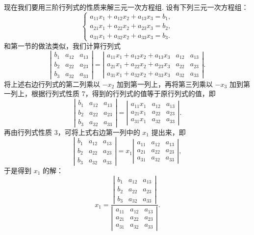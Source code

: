 \documentclass[UTF8,12pt,a4paper,fontset=fandol]{ctexart}
\begin{document}
现在我们要用三阶行列式的性质来解三元一次方程组. 设有下列三元一次方程组：
\begin{equation}
\left\{
\begin{array}{l}
a_{11}x_1+a_{12}x_2+a_{13}x_3=b_1,\\
a_{21}x_1+a_{22}x_2+a_{23}x_3=b_2,\\
a_{31}x_1+a_{32}x_2+a_{33}x_3=b_3.
\end{array}
\right.
\tag{1.2.2}
\end{equation}
和第一节的做法类似，我们计算行列式
\[
\left|\begin{array}{ccc}
b_1 & a_{12} & a_{13}\\
b_2 & a_{22} & a_{23}\\
b_3 & a_{32} & a_{33}
\end{array}\right|
=
\left|\begin{array}{ccc}
a_{11}x_1+a_{12}x_2+a_{13}x_3 & a_{12} & a_{13}\\
a_{21}x_1+a_{22}x_2+a_{23}x_3 & a_{22} & a_{23}\\
a_{31}x_1+a_{32}x_2+a_{33}x_3 & a_{32} & a_{33}
\end{array}\right|.
\]
将上述右边行列式的第二列乘以 $-x_2$ 加到第一列上，再将第三列乘以 $-x_3$ 加到第一列上，根据行列式性质 7，得到的行列式的值等于原行列式的值，即
\[
\left|\begin{array}{ccc}
b_1 & a_{12} & a_{13}\\
b_2 & a_{22} & a_{23}\\
b_3 & a_{32} & a_{33}
\end{array}\right|
=
\left|\begin{array}{ccc}
a_{11}x_1 & a_{12} & a_{13}\\
a_{21}x_1 & a_{22} & a_{23}\\
a_{31}x_1 & a_{32} & a_{33}
\end{array}\right|.
\]
再由行列式性质 3，可将上式右边第一列中的 $x_1$ 提出来，即
\[
\left|\begin{array}{ccc}
b_1 & a_{12} & a_{13}\\
b_2 & a_{22} & a_{23}\\
b_3 & a_{32} & a_{33}
\end{array}\right|
=x_1
\left|\begin{array}{ccc}
a_{11} & a_{12} & a_{13}\\
a_{21} & a_{22} & a_{23}\\
a_{31} & a_{32} & a_{33}
\end{array}\right|,
\]
于是得到 $x_1$ 的解：
\[
x_1=
\frac{
\left|\begin{array}{ccc}
b_1 & a_{12} & a_{13}\\
b_2 & a_{22} & a_{23}\\
b_3 & a_{32} & a_{33}
\end{array}\right|}
{\left|\begin{array}{ccc}
a_{11} & a_{12} & a_{13}\\
a_{21} & a_{22} & a_{23}\\
a_{31} & a_{32} & a_{33}
\end{array}\right|}.
\]
\end{document}
